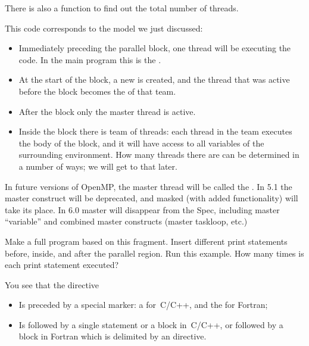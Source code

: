 There is also a function
 to find out the total number of threads.


This code corresponds to the model we just discussed:
\begin{itemize}
\item Immediately preceding the parallel block, one thread will be
  executing the code.
  In the main program this is the .
\item At the start of the block, a new  is
  created, and the thread that was active before the block
  becomes the  of that team.
\item After the block only the master thread is active.
\item Inside the block there is team of threads: each thread in the
  team executes the body of the block, and it will have access to all
  variables of the surrounding environment.
  How many
  threads there are can be determined in a number of ways; we will get to that later.
\end{itemize}

\begin{remark}
  In future versions of OpenMP, the master thread will be called
  the .
  In 5.1 the master construct will be deprecated, and masked (with
  added functionality) will take its place.  In 6.0 master will
  disappear from the Spec, including  master “variable”
  and combined master constructs (master taskloop, etc.)
\end{remark}

\begin{exercise}
  Make a full program based on this fragment. Insert different print statements
  before, inside, and after the parallel region.
  Run this example. How many times is each print statement executed?
\end{exercise}

You see that the  directive
\begin{itemize}
\item Is preceded by a special marker: a  for~C/C++,
  and the   for Fortran;
\item Is followed by a single statement or a block in~C/C++,
  or followed by a block in Fortran which is delimited by an  directive.
\end{itemize}

